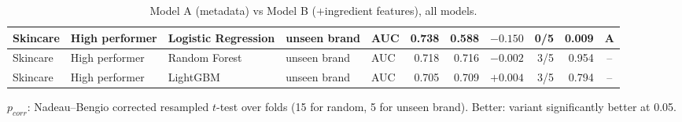 \begin{table}[htbp]
\begin{tabular}{|l|l|l|l|l|r|r|r|r|r|c|}
\hline
Skincare & High performer & Logistic Regression & unseen brand & AUC & 0.738 & 0.588 & $-0.150$ & 0/5 & 0.009 & A \\
\hline
Skincare & High performer & Random Forest & unseen brand & AUC & 0.718 & 0.716 & $-0.002$ & 3/5 & 0.954 & -- \\
\hline
Skincare & High performer & LightGBM & unseen brand & AUC & 0.705 & 0.709 & $+0.004$ & 3/5 & 0.794 & -- \\
\hline
\end{tabular}
\par\smallskip
\parbox{0.95\linewidth}{\footnotesize $p_{corr}$: Nadeau--Bengio corrected resampled $t$-test over folds (15 for random, 5 for unseen brand). Better: variant significantly better at 0.05.}
\caption{Model A (metadata) vs Model B (+ingredient features), all models.}
\label{tab:models_full}
\end{table}
